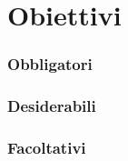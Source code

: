 
\section{Obiettivi}

		\subsubsection*{Obbligatori}
		\begin{itemize}
			\obiettiviObbligatori
		\end{itemize}
		
		\subsubsection*{Desiderabili}
		\begin{itemize}
			\obiettiviDesiderabili
		\end{itemize}
		
		\subsubsection*{Facoltativi}
		\begin{itemize}
			\obiettiviFacoltativi
		\end{itemize} 
